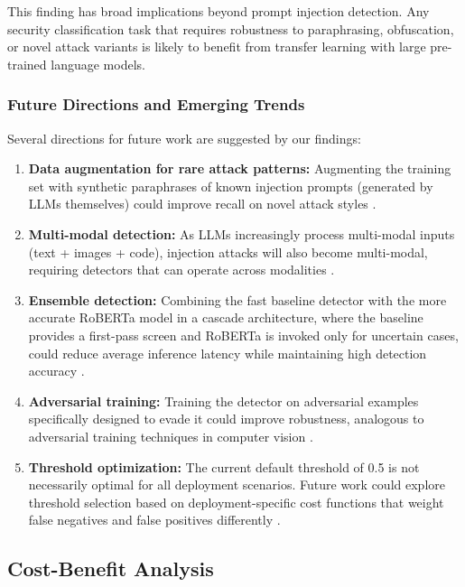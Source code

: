 \documentclass[12pt, letterpaper]{article}   %
\begin{document}
This finding has broad implications beyond prompt injection detection. Any security classification task that requires robustness to paraphrasing, obfuscation, or novel attack variants is likely to benefit from transfer learning with large pre-trained language models.

\subsubsection{Future Directions and Emerging Trends}

Several directions for future work are suggested by our findings:

\begin{enumerate}
    \item \textbf{Data augmentation for rare attack patterns:} Augmenting the training set with synthetic paraphrases of known injection prompts (generated by LLMs themselves) could improve recall on novel attack styles \cite{ref28}\cite{ref20}.
    \item \textbf{Multi-modal detection:} As LLMs increasingly process multi-modal inputs (text + images + code), injection attacks will also become multi-modal, requiring detectors that can operate across modalities \cite{ref16}.
    \item \textbf{Ensemble detection:} Combining the fast baseline detector with the more accurate RoBERTa model in a cascade architecture, where the baseline provides a first-pass screen and RoBERTa is invoked only for uncertain cases, could reduce average inference latency while maintaining high detection accuracy \cite{ref7}\cite{ref38}.
    \item \textbf{Adversarial training:} Training the detector on adversarial examples specifically designed to evade it could improve robustness, analogous to adversarial training techniques in computer vision \cite{ref43}\cite{ref3}.
    \item \textbf{Threshold optimization:} The current default threshold of 0.5 is not necessarily optimal for all deployment scenarios. Future work could explore threshold selection based on deployment-specific cost functions that weight false negatives and false positives differently \cite{ref28}.
\end{enumerate}


\subsection{Cost-Benefit Analysis}
\end{document}
